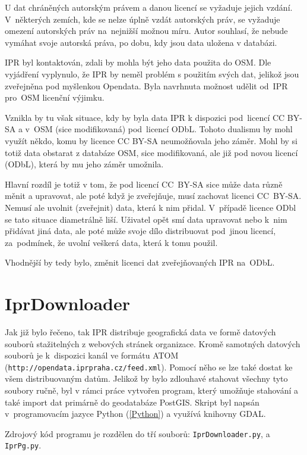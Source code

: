 U dat chráněných autorským právem a danou licencí se vyžaduje jejich
vzdání. V~některých zemích, kde se nelze úplně vzdát autorských
práv, se vyžaduje omezení autorských práv na~nejnižší možnou
míru. Autor souhlasí, že nebude vymáhat svoje autorská práva, po dobu,
kdy jsou data uložena v databázi. \cite{ODbl}

IPR byl kontaktován, zdali by mohla být jeho data použita do OSM.
Dle vyjádření vyplynulo, že IPR by neměl problém s použitím svých dat,
jelikož jsou zveřejněna pod myšlenkou Opendata. Byla navrhnuta
možnost udělit od~IPR pro~OSM licenční výjimku.

Vznikla by tu však situace, kdy by byla data IPR k dispozici 
pod~licencí CC BY-SA a v~OSM (sice modifikovaná) pod~licencí
ODbL. Tohoto dualismu by mohl využít někdo, komu by licence CC BY-SA
neumožňovala jeho záměr. Mohl by si totiž data obstarat z databáze OSM,
sice modifikovaná, ale již pod novou licencí (ODbL), která by mu jeho
záměr umožnila.

Hlavní rozdíl je totiž v tom, že pod licencí CC~BY-SA sice může data
různě měnit a upravovat, ale poté když je zveřejňuje, musí zachovat
licenci CC~BY-SA. Nemusí ale uvolnit (zveřejnit) data, která k nim 
přidal. V~případě licence ODbl se tato situace diametrálně liší.
Uživatel opět smí data upravovat nebo k~nim přidávat jiná data, ale
poté může svoje dílo distribuovat pod~jinou licencí, za~podmínek, že
uvolní veškerá data, která k tomu použil.

Vhodnější by tedy bylo, změnit licenci dat zveřejňovaných IPR
na~ODbL.

\section{IprDownloader}
\label{IprDownloader}
Jak již bylo řečeno, tak IPR distribuje geografická data ve formě datových souborů stažitelných z webových stránek organizace.
Kromě samotných datových souborů je k~dispozici kanál ve formátu ATOM ({\tt http://opendata.iprpraha.cz/feed.xml}).
Pomocí něho se lze také dostat ke všem distribuovaným datům. Jelikož
by bylo zdlouhavé stahovat všechny tyto soubory ručně, byl
v rámci práce vytvořen program, který umožňuje stahování a také import dat primárně do geodatabáze PostGIS.
Skript byl napsán v~programovacím jazyce Python (\ref{Python}) a využívá knihovny GDAL.

Zdrojový kód programu je rozdělen do tří souborů: 
{\tt IprDownloader.py},  a {\tt IprPg.py}.


